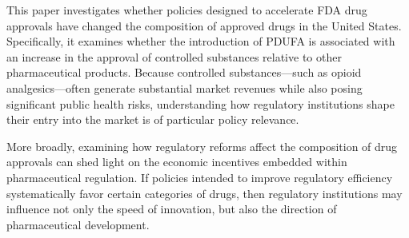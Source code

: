 This paper investigates whether policies designed to accelerate FDA drug approvals have changed the composition of approved drugs in the United States. Specifically, it examines whether the introduction of PDUFA is associated with an increase in the approval of controlled substances relative to other pharmaceutical products. Because controlled substances—such as opioid analgesics—often generate substantial market revenues while also posing significant public health risks, understanding how regulatory institutions shape their entry into the market is of particular policy relevance.

More broadly, examining how regulatory reforms affect the composition of drug approvals can shed light on the economic incentives embedded within pharmaceutical regulation. If policies intended to improve regulatory efficiency systematically favor certain categories of drugs, then regulatory institutions may influence not only the speed of innovation, but also the direction of pharmaceutical development.

